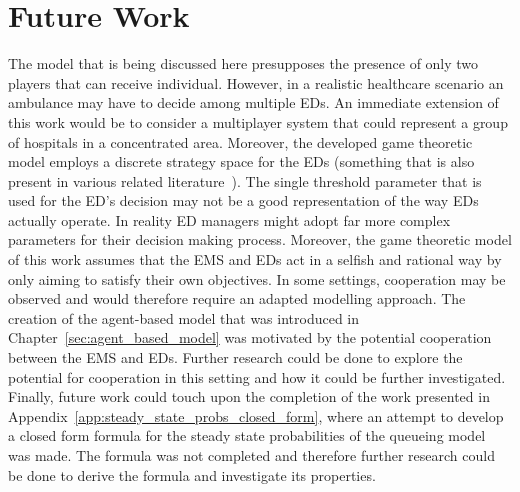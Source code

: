 \section{Future Work}

The model that is being discussed here presupposes the presence of only two
players that can receive individual.
However, in a realistic healthcare scenario an ambulance may have to decide
among multiple EDs.
An immediate extension of this work would be to consider a multiplayer system
that could represent a group of hospitals in a concentrated area.
Moreover, the developed game theoretic model employs a discrete strategy space
for the EDs (something that is also present in various related
literature~\cite{deo2011centralized,knight_measuring_poa}).
The single threshold parameter that is used for the ED's decision may not be
a good representation of the way EDs actually operate.
In reality ED managers might adopt far more complex parameters for their
decision making process.
Moreover, the game theoretic model of this work assumes that the EMS and EDs
act in a selfish and rational way by only aiming to satisfy their own
objectives.
In some settings, cooperation may be observed and would therefore require
an adapted modelling approach.
The creation of the agent-based model that was introduced in
Chapter~\ref{sec:agent_based_model} was motivated by the potential cooperation
between the EMS and EDs.
Further research could be done to explore the potential for cooperation in
this setting and how it could be further investigated.
Finally, future work could touch upon the completion of the work presented in
Appendix~\ref{app:steady_state_probs_closed_form}, where an attempt to develop
a closed
form formula for the steady state probabilities of the queueing model was
made.
The formula was not completed and therefore further research could be done to
derive the formula and investigate its properties.
